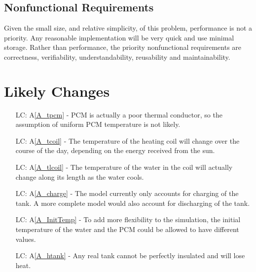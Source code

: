 \documentclass[12pt]{article}
\newcommand{\aref}[1]{A\ref{#1}}
\newcounter{lcnum} %
\begin{document}
\subsection{Nonfunctional Requirements}

Given the small size, and relative simplicity, of this problem, performance is
not a priority.  Any reasonable implementation will be very quick and use
minimal storage.  Rather than performance, the priority nonfunctional
requirements are correctness, verifiability, understandability, reusability and
maintainability.

\section{Likely Changes}    

\noindent \begin{itemize}

\item[LC\refstepcounter{lcnum}\thelcnum\label{LC_tpcm}:]\aref{A_tpcm} - PCM is
  actually a poor thermal conductor, so the assumption of uniform PCM
  temperature is not likely.

\item[LC\refstepcounter{lcnum}\thelcnum \label{LC_tcoil}:]\aref{A_tcoil} - The
  temperature of the heating coil will change over the course of the day,
  depending on the energy received from the sun.

\item[LC\refstepcounter{lcnum}\thelcnum \label{LC_tlcoil}:]\aref{A_tlcoil} - The
  temperature of the water in the coil will actually change along its length as
  the water cools.

\item[LC\refstepcounter{lcnum}\thelcnum \label{LC_charge}:]\aref{A_charge} - The
  model currently only accounts for charging of the tank.  A more complete model
  would also account for discharging of the tank.

\item[LC\refstepcounter{lcnum}\thelcnum \label{LC_InitTemp}:]\aref{A_InitTemp} - To
  add more flexibility to the simulation, the initial temperature of the water
  and the PCM could be allowed to have different values.

\item[LC\refstepcounter{lcnum}\thelcnum \label{LC_htank}:]\aref{A_htank} - Any
  real tank cannot be perfectly insulated and will lose heat.

\end{itemize}
\end{document}
